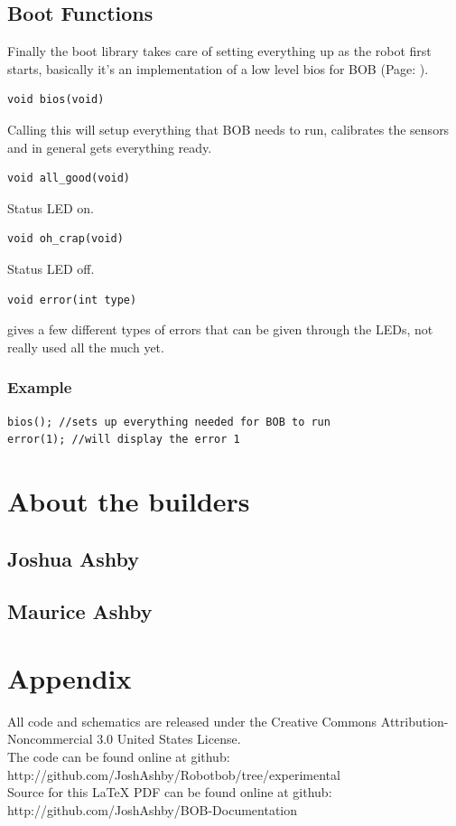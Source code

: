 \documentclass{article}
\begin{document}
\subsection{Boot Functions}
Finally the boot library takes care of setting everything up as the robot first starts, basically it's an implementation of a low level bios for BOB (Page: \pageref{boot}).\\
\begin{verbatim}void bios(void)\end{verbatim}
Calling this will setup everything that BOB needs to run, calibrates the sensors and in general gets everything ready.
\begin{verbatim}void all_good(void)\end{verbatim}
Status LED on.
\begin{verbatim}void oh_crap(void)\end{verbatim}
Status LED off.
\begin{verbatim}void error(int type)\end{verbatim}
gives a few different types of errors that can be given through the LEDs, not really used all the much yet.
\subsubsection{Example}
\begin{lstlisting}[caption={Boot examples},label=bootex,frame=bl]
bios(); //sets up everything needed for BOB to run
error(1); //will display the error 1
\end{lstlisting}

\newpage
\section{About the builders}
\subsection{Joshua Ashby}
\subsection{Maurice Ashby}

\newpage
\section{Appendix}
All code and schematics are released under the Creative Commons Attribution-Noncommercial 3.0 United States License.\\
The code can be found online at github: http://github.com/JoshAshby/Robotbob/tree/experimental\\
Source for this LaTeX PDF can be found online at github: http://github.com/JoshAshby/BOB-Documentation\\
\end{document}
